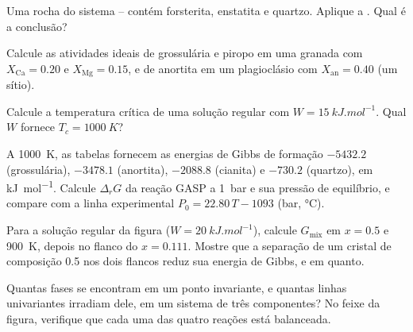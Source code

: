 \begin{exercise}[$\star$]\label{exo:b3:petrological-thermodynamics:2}
Uma rocha do sistema -- contém forsterita, enstatita e
quartzo. Aplique a . Qual é a conclusão?
\end{exercise}

\begin{exercise}[$\star$]\label{exo:b3:petrological-thermodynamics:3}
Calcule as atividades ideais de grossulária e piropo em uma granada com
$X_{\text{Ca}} = 0.20$ e $X_{\text{Mg}} = 0.15$, e de anortita em um
plagioclásio com $X_{\text{an}} = 0.40$ (um sítio).
\end{exercise}

\begin{exercise}[$\star$]\label{exo:b3:petrological-thermodynamics:4}
Calcule a temperatura crítica de uma solução regular com $W =
\qty{15}{kJ.mol^{-1}}$. Qual $W$ fornece $T_c = \qty{1000}{K}$?
\end{exercise}

\begin{exercise}[$\star\star$]\label{exo:b3:petrological-thermodynamics:5}
A \qty{1000}{K}, as tabelas fornecem as energias de Gibbs de formação
$-5432.2$ (grossulária), $-3478.1$ (anortita), $-2088.8$ (cianita) e $-730.2$
(quartzo), em \unit{kJ.mol^{-1}}. Calcule $\Delta_rG$ da reação GASP a
\qty{1}{bar} e sua pressão de equilíbrio, e compare com a linha experimental
$P_0 = 22.80\,T - 1093$ (bar, \unit{\celsius}).
\end{exercise}

\begin{exercise}[$\star\star$]\label{exo:b3:petrological-thermodynamics:6}
Para a solução regular da figura ($W = \qty{20}{kJ.mol^{-1}}$), calcule
$G_{\text{mix}}$ em $x = 0.5$ e \qty{900}{K}, depois no flanco do  $x =
0.111$. Mostre que a separação de um cristal de composição 0.5 nos dois
flancos reduz sua energia de Gibbs, e em quanto.
\end{exercise}

\begin{exercise}[$\star\star$]\label{exo:b3:petrological-thermodynamics:7}
Quantas fases se encontram em um ponto invariante, e quantas linhas univariantes
irradiam dele, em um sistema de três componentes? No feixe da
figura, verifique que cada uma das quatro reações está balanceada.
\end{exercise}

